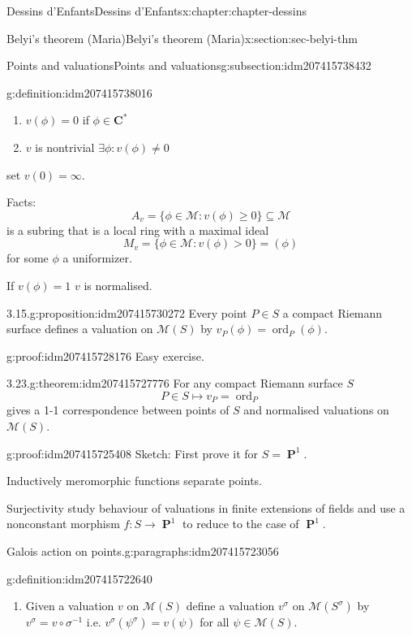 \documentclass[oneside,10pt,]{book}
\numberwithin{equation}{section}
\newcommand{\CC}{\mathbf{C}}
\DeclareMathOperator{\ord}{ord}
\DeclareMathOperator{\PP}{\mathbf{P}}
\newcommand{\gt}{>}
\begin{document}
\begin{chapterptx}{Dessins d'Enfants}{}{Dessins d'Enfants}{}{}{x:chapter:chapter-dessins}
\begin{sectionptx}{Belyi's theorem (Maria)}{}{Belyi's theorem (Maria)}{}{}{x:section:sec-belyi-thm}
\begin{subsectionptx}{Points and valuations}{}{Points and valuations}{}{}{g:subsection:idm207415738432}
\begin{definition}{}{g:definition:idm207415738016}
\begin{enumerate}
\item{}\(v(\phi) = 0 \) if \(\phi \in \CC^*\)%
\item{}\(v\) is nontrivial \(\exists \phi : v(\phi)\ne 0\)%
\end{enumerate}
set \(v(0) = \infty\).%
\end{definition}
Facts:%
\begin{equation*}
A_v = \{\phi \in \mathcal M : v(\phi) \ge 0 \} \subseteq \mathcal M
\end{equation*}
is a subring that is a local ring with a maximal ideal%
\begin{equation*}
M_v = \{ \phi\in \mathcal M : v(\phi) \gt 0\} = (\phi)
\end{equation*}
for some \(\phi\) a uniformizer.%
\par
If \(v(\phi) = 1\) \(v\) is normalised.%
\begin{proposition}{3.15.}{}{g:proposition:idm207415730272}%
Every point \(P \in S\) a compact Riemann surface defines a valuation on \(\mathcal M(S)\) by \(v_P(\phi) = \ord_P(\phi)\).%
\end{proposition}
\begin{proofptx}{}{g:proof:idm207415728176}
Easy exercise.%
\end{proofptx}
\begin{theorem}{3.23.}{}{g:theorem:idm207415727776}%
For any compact Riemann surface \(S\)%
\begin{equation*}
P\in S \mapsto v_P = \ord_P
\end{equation*}
gives a 1-1 correspondence between points of \(S\) and normalised valuations on \(\mathcal M(S)\).%
\end{theorem}
\begin{proofptx}{}{g:proof:idm207415725408}
Sketch: First prove it for \(S = \PP^1\).%
\par
Inductively meromorphic functions separate points.%
\par
Surjectivity study behaviour of valuations in finite extensions of fields and use a nonconstant morphism \(f\colon S \to \PP^1\) to reduce to the case of \(\PP^1\).%
\end{proofptx}
\begin{paragraphs}{Galois action on points.}{g:paragraphs:idm207415723056}%
\begin{definition}{}{g:definition:idm207415722640}%
%
\begin{enumerate}
\item{}Given a valuation \(v\) on \(\mathcal M(S)\) define a valuation \(v^\sigma\) on \(\mathcal M(S^\sigma)\) by \(v^\sigma = v\circ \sigma^{-1}\) i.e. \(v^\sigma(\psi^\sigma) = v(\psi)\) for all \(\psi \in \mathcal M(S)\).%

\end{enumerate}
\end{definition}
\end{paragraphs}
\end{subsectionptx}
\end{sectionptx}
\end{chapterptx}
\end{document}
